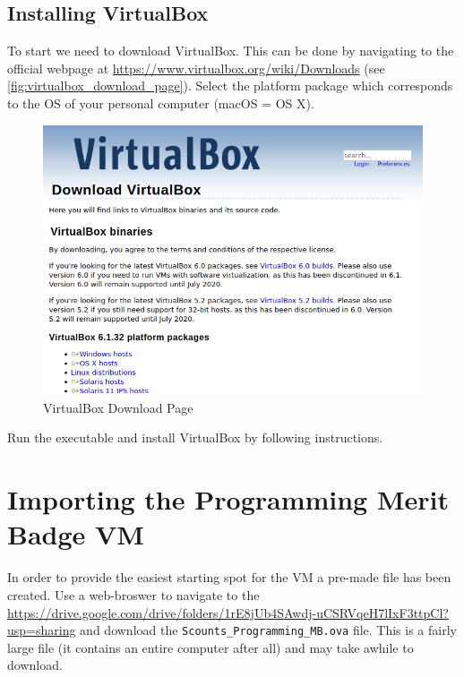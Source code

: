     \subsection{Installing VirtualBox}
    \label{ssec:installing_virtualbox}

      To start we need to download VirtualBox.
      This can be done by navigating to the official webpage at \href{https://www.virtualbox.org/wiki/Downloads}
        {https://www.virtualbox.org/wiki/Downloads} (see \autoref{fig:virtualbox_download_page}).
      Select the platform package which corresponds to the OS of your personal computer (macOS = OS X).
      
      \begin{figure}[ht]
        \centering
        \includegraphics[width=0.8\linewidth]{virtualbox_download_page.png}
        \caption{VirtualBox Download Page}
        \label{fig:virtualbox_download_page}
      \end{figure}
      \FloatBarrier

      Run the executable and install VirtualBox by following instructions.

  \section{Importing the Programming Merit Badge VM}
  \label{sec:import_merit_badge_vm}

    In order to provide the easiest starting spot for the VM a pre-made file has been created.
    Use a web-broswer to navigate to the \href{Google Drive Folder}{https://drive.google.com/drive/folders/1rE8jUb4SAwdj-uCSRVqeH7lIxF3ttpCl?usp=sharing}
      and download the \texttt{Scounts_Programming_MB.ova} file.
    This is a fairly large file (it contains an entire computer after all) and may take awhile to download.

